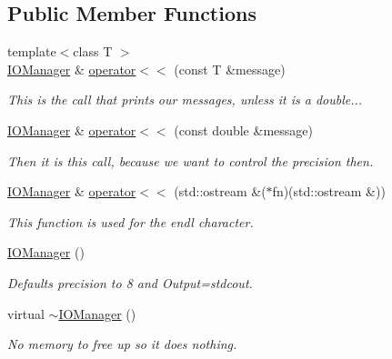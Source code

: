 \subsection*{Public Member Functions}
\begin{DoxyCompactItemize}
\item 
{\footnotesize template$<$class T $>$ }\\\hyperlink{classJKBuilder_1_1IOManager}{IOManager} \& \hyperlink{classJKBuilder_1_1IOManager_a505a35212a21e4884ed24b021c0add4b}{operator$<$$<$} (const T \&message)
\begin{DoxyCompactList}\small\item\em This is the call that prints our messages, unless it is a double... \item\end{DoxyCompactList}\item 
\hyperlink{classJKBuilder_1_1IOManager}{IOManager} \& \hyperlink{classJKBuilder_1_1IOManager_a127779d1803b6ffe9e44a3a36e46910e}{operator$<$$<$} (const double \&message)
\begin{DoxyCompactList}\small\item\em Then it is this call, because we want to control the precision then. \item\end{DoxyCompactList}\item 
\hyperlink{classJKBuilder_1_1IOManager}{IOManager} \& \hyperlink{classJKBuilder_1_1IOManager_a4ab394f377d37c6598659317320ec38c}{operator$<$$<$} (std::ostream \&($\ast$fn)(std::ostream \&))
\begin{DoxyCompactList}\small\item\em This function is used for the endl character. \item\end{DoxyCompactList}\item 
\hyperlink{classJKBuilder_1_1IOManager_afabc1befb314e6ce3d793ab1319295c5}{IOManager} ()
\begin{DoxyCompactList}\small\item\em Defaults precision to 8 and Output=stdcout. \item\end{DoxyCompactList}\item 
virtual \hyperlink{classJKBuilder_1_1IOManager_ad7f67249558880cb6386ff44abea33f2}{$\sim$IOManager} ()
\begin{DoxyCompactList}\small\item\em No memory to free up so it does nothing. \item\end{DoxyCompactList}\end{DoxyCompactItemize}
